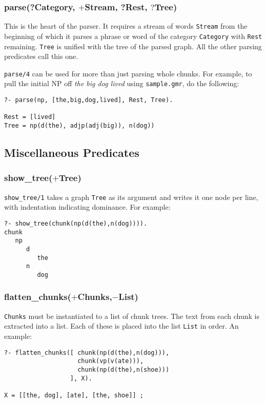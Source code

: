 \documentclass[12pt]{article}
\begin{document}
\subsubsection*{parse(?Category, $+$Stream, ?Rest, $?$Tree)}

This is the heart of the parser.  It requires a stream of words \verb+Stream+ from the beginning of which it parses a phrase or word of the category \verb+Category+ with \verb+Rest+ remaining.  \verb+Tree+ is unified with the tree of the parsed graph.  All the other parsing predicates call this one.

\verb+parse/4+ can be used for more than just parsing whole chunks.  For example, to pull the initial NP off \emph{the big dog lived} using \verb+sample.gmr+, do the following:
\begin{verbatim}
?- parse(np, [the,big,dog,lived], Rest, Tree).

Rest = [lived]
Tree = np(d(the), adjp(adj(big)), n(dog))
\end{verbatim}

\subsection{Miscellaneous Predicates}

\subsubsection*{show\_tree($+$Tree)}

\verb+show_tree/1+ takes a graph \verb+Tree+ as its argument and writes it one node per line, with indentation indicating dominance.  For example:
\begin{verbatim}
?- show_tree(chunk(np(d(the),n(dog)))).
chunk
   np
      d
         the
      n
         dog
\end{verbatim}

\subsubsection*{flatten\_chunks($+$Chunks,$-$List)}

\verb+Chunks+ must be instantiated to a list of chunk trees.  The text from each chunk is extracted into a list.  Each of these is placed into the list \verb+List+ in order.  An example:
\begin{verbatim}
?- flatten_chunks([ chunk(np(d(the),n(dog))), 
                    chunk(vp(v(ate))), 
                    chunk(np(d(the),n(shoe))) 
                  ], X).

X = [[the, dog], [ate], [the, shoe]] ;
\end{verbatim}
\end{document}
